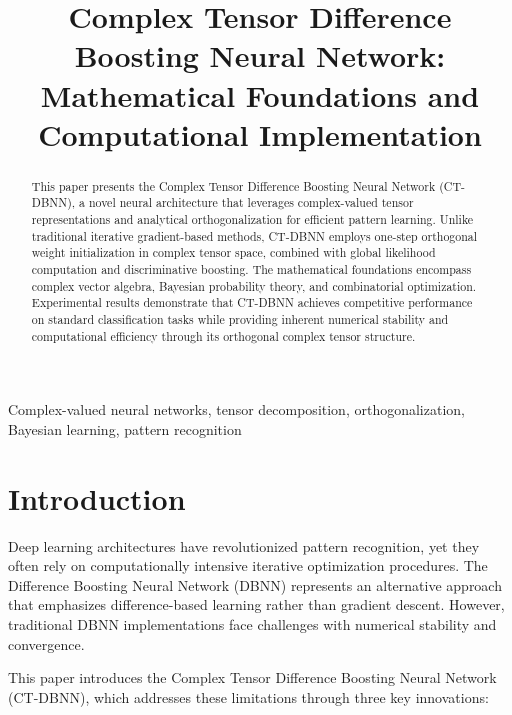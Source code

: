 \documentclass[journal]{IEEEtran}
\begin{document}
\title{Complex Tensor Difference Boosting Neural Network: Mathematical Foundations and Computational Implementation}

\author{
}

\maketitle

\begin{abstract}
This paper presents the Complex Tensor Difference Boosting Neural Network (CT-DBNN), a novel neural architecture that leverages complex-valued tensor representations and analytical orthogonalization for efficient pattern learning. Unlike traditional iterative gradient-based methods, CT-DBNN employs one-step orthogonal weight initialization in complex tensor space, combined with global likelihood computation and discriminative boosting. The mathematical foundations encompass complex vector algebra, Bayesian probability theory, and combinatorial optimization. Experimental results demonstrate that CT-DBNN achieves competitive performance on standard classification tasks while providing inherent numerical stability and computational efficiency through its orthogonal complex tensor structure.
\end{abstract}

\begin{IEEEkeywords}
Complex-valued neural networks, tensor decomposition, orthogonalization, Bayesian learning, pattern recognition
\end{IEEEkeywords}

\section{Introduction}

Deep learning architectures have revolutionized pattern recognition, yet they often rely on computationally intensive iterative optimization procedures. The Difference Boosting Neural Network (DBNN) represents an alternative approach that emphasizes difference-based learning rather than gradient descent. However, traditional DBNN implementations face challenges with numerical stability and convergence.

This paper introduces the Complex Tensor Difference Boosting Neural Network (CT-DBNN), which addresses these limitations through three key innovations:
\end{document}
